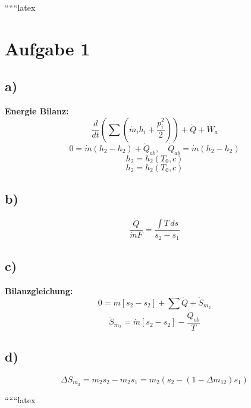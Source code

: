 
``````latex


\section*{Aufgabe 1}

\subsection*{a)}
\textbf{Energie Bilanz:}
\[
\frac{d}{dt} \left( \sum \left( \dot{m}_i h_i + \frac{p_i^2}{2} \right) \right) + \dot{Q} + \dot{W}_a
\]
\[
0 = \dot{m} (h_2 - h_2) + \dot{Q}_{ab}, \quad \dot{Q}_{ab} = \dot{m} (h_2 - h_2)
\]
\[
h_2 = h_2 (T_0, c)
\]
\[
h_2 = h_2 (T_0, c)
\]

\subsection*{b)}
\[
\frac{\dot{Q}}{\dot{m} F} = \frac{\int T \, ds}{s_2 - s_1}
\]

\subsection*{c)}
\textbf{Bilanzgleichung:}
\[
0 = \dot{m} [s_2 - s_2] + \sum \dot{Q} + \dot{S}_{m_2}
\]
\[
\dot{S}_{m_2} = \dot{m} [s_2 - s_2] - \frac{\dot{Q}_{ab}}{T}
\]

\subsection*{d)}
\[
\Delta S_{m_2} = m_2 s_2 - m_2 s_1 = m_2 \left( s_2 - (1 - \Delta m_{12}) s_1 \right)
\]

``````latex


